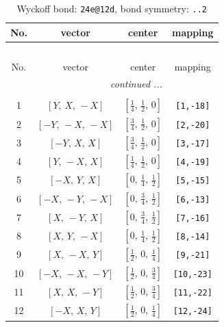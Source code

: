 \documentclass[fleqn,8pt]{jsarticle}
\begin{document}
\renewcommand{\arraystretch}{1.2}
\begin{longtable}{cccc}
\caption{Wyckoff bond: {\tt 24e@12d}, bond symmetry: {\tt ..2}}
 \\
 \hline \hline
No. & vector & center & mapping \\ \hline \endfirsthead

\multicolumn{3}{l}{\tablename\ \thetable{}} \\
 \hline \hline
No. & vector & center & mapping \\ \hline \endhead

 \hline \hline
\multicolumn{3}{r}{\footnotesize\it continued ...} \\ \endfoot

 \hline \hline
\multicolumn{3}{r}{} \\ \endlastfoot

1 & $\left[ Y,\, X,\, - X \right]$ & $\left[ \frac{1}{4},\, \frac{1}{2},\, 0 \right]$ & {\tt [1,-18]} \\ \hline
2 & $\left[ - Y,\, - X,\, - X \right]$ & $\left[ \frac{3}{4},\, \frac{1}{2},\, 0 \right]$ & {\tt [2,-20]} \\ \hline
3 & $\left[ - Y,\, X,\, X \right]$ & $\left[ \frac{3}{4},\, \frac{1}{2},\, 0 \right]$ & {\tt [3,-17]} \\ \hline
4 & $\left[ Y,\, - X,\, X \right]$ & $\left[ \frac{1}{4},\, \frac{1}{2},\, 0 \right]$ & {\tt [4,-19]} \\ \hline
5 & $\left[ - X,\, Y,\, X \right]$ & $\left[ 0,\, \frac{1}{4},\, \frac{1}{2} \right]$ & {\tt [5,-15]} \\ \hline
6 & $\left[ - X,\, - Y,\, - X \right]$ & $\left[ 0,\, \frac{3}{4},\, \frac{1}{2} \right]$ & {\tt [6,-13]} \\ \hline
7 & $\left[ X,\, - Y,\, X \right]$ & $\left[ 0,\, \frac{3}{4},\, \frac{1}{2} \right]$ & {\tt [7,-16]} \\ \hline
8 & $\left[ X,\, Y,\, - X \right]$ & $\left[ 0,\, \frac{1}{4},\, \frac{1}{2} \right]$ & {\tt [8,-14]} \\ \hline
9 & $\left[ X,\, - X,\, Y \right]$ & $\left[ \frac{1}{2},\, 0,\, \frac{1}{4} \right]$ & {\tt [9,-21]} \\ \hline
10 & $\left[ - X,\, - X,\, - Y \right]$ & $\left[ \frac{1}{2},\, 0,\, \frac{3}{4} \right]$ & {\tt [10,-23]} \\ \hline
11 & $\left[ X,\, X,\, - Y \right]$ & $\left[ \frac{1}{2},\, 0,\, \frac{3}{4} \right]$ & {\tt [11,-22]} \\ \hline
12 & $\left[ - X,\, X,\, Y \right]$ & $\left[ \frac{1}{2},\, 0,\, \frac{1}{4} \right]$ & {\tt [12,-24]} \\
\end{longtable}
\end{document}
